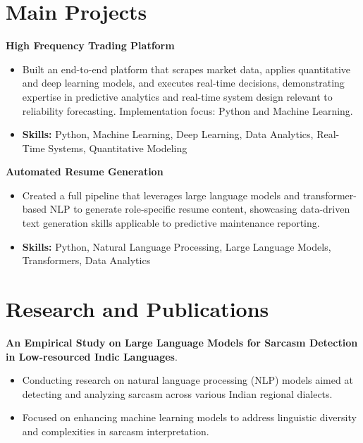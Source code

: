 \documentclass[a4paper,11pt]{article}
\begin{document}
\section{\textbf{Main Projects}}

\vspace{1mm}
  \textbf{High Frequency Trading Platform  }
\vspace{-1.5mm} %
\begin{itemize}
  \item Built an end-to-end platform that scrapes market data, applies quantitative and deep learning models, and executes real-time decisions, demonstrating expertise in predictive analytics and real-time system design relevant to reliability forecasting. Implementation focus: Python and Machine Learning.
\vspace{-3mm}
  \item \textbf{Skills:} Python, Machine Learning, Deep Learning, Data Analytics, Real-Time Systems, Quantitative Modeling
\end{itemize}


\vspace{1mm}
   \textbf{Automated Resume Generation }
\vspace{-1.5mm} %
\begin{itemize}
  \item Created a full pipeline that leverages large language models and transformer-based NLP to generate role-specific resume content, showcasing data-driven text generation skills applicable to predictive maintenance reporting.
\vspace{-3mm}
  \item \textbf{Skills:} Python, Natural Language Processing, Large Language Models, Transformers, Data Analytics
\end{itemize}



\section{\textbf{Research and Publications} \hfill }
\vspace{1mm}
  \textbf{An Empirical Study on Large Language Models for Sarcasm Detection in Low-resourced Indic Languages}.
\vspace{-1mm} %
\begin{itemize}
  \item Conducting research on natural language processing (NLP) models aimed at detecting and analyzing sarcasm across various Indian regional dialects.
\vspace{-3mm}
  \item Focused on enhancing machine learning models to address linguistic diversity and complexities in sarcasm interpretation.
\end{itemize}
\end{document}
